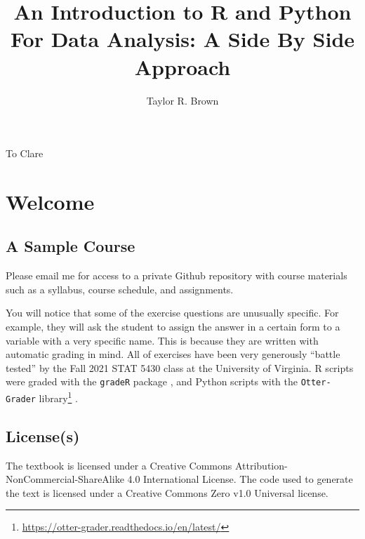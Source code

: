\documentclass[
  12pt,
  krantz2]{krantz}
\title{An Introduction to R and Python For Data Analysis: A Side By Side Approach}
\author{Taylor R. Brown}
\date{}
\renewcommand{\href}[2]{#2\footnote{\url{#1}}}
\begin{document}
\maketitle


\thispagestyle{empty}

\begin{center}
To Clare
\end{center}

\setlength{\abovedisplayskip}{-5pt}
\setlength{\abovedisplayshortskip}{-5pt}

{
\setcounter{tocdepth}{2}
\tableofcontents
}
\listoftables
\listoffigures
\hypertarget{welcome}{%
\chapter*{Welcome}\label{welcome}}


\hypertarget{a-sample-course}{%
\section*{A Sample Course}\label{a-sample-course}}


Please email me for access to a private Github repository with course materials such as a syllabus, course schedule, and assignments.

You will notice that some of the exercise questions are unusually specific. For example, they will ask the student to assign the answer in a certain form to a variable with a very specific name. This is because they are written with automatic grading in mind. All of exercises have been very generously ``battle tested'' by the Fall 2021 STAT 5430 class at the University of Virginia. R scripts were graded with the \texttt{gradeR} package \citep{gradeR}, and Python scripts with the \href{https://otter-grader.readthedocs.io/en/latest/}{\texttt{Otter-Grader} library} \citep{otter}.

\hypertarget{licenses}{%
\section*{License(s)}\label{licenses}}


The textbook is licensed under a Creative Commons Attribution-NonCommercial-ShareAlike 4.0 International License. The code used to generate the text is licensed under a Creative Commons Zero v1.0 Universal license.
\end{document}
